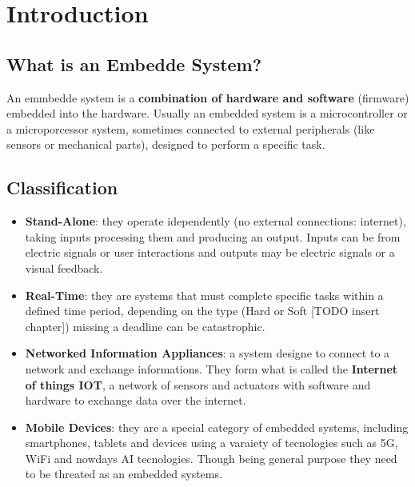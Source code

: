 \section{Introduction}
\subsection{What is an Embedde System?}
  An emmbedde system is a \textbf{combination of hardware and software} (firmware) embedded into the hardware. 
  Usually an embedded system is a microcontroller or a microporcessor system, sometimes connected to external peripherals (like sensors or mechanical parts), designed to perform a specific task. 

\subsection{Classification}
  \begin{itemize}
    \item {\textbf{Stand-Alone}: they operate idependently (no external connections: internet), taking inputs processing them and producing an output. Inputs can be from electric signals or user interactions and outputs may be electric signals or a visual feedback.}
    \item {\textbf{Real-Time}: they are systems that must complete specific tasks within a defined time period, depending on the type (Hard or Soft [TODO insert chapter]) missing a deadline can be catastrophic.}
    \item {\textbf{Networked Information Appliances}: a system designe to connect to a network and exchange informations. They form what is called the \textbf{Internet of things \textemdash IOT}, a network of sensors and actuators with software and hardware to exchange data over the internet.}
    \item {\textbf{Mobile Devices}: they are a special category of embedded systems, including smartphones, tablets and devices using a varaiety of tecnologies such as 5G, Wi\textemdash Fi and nowdays AI tecnologies. Though being general purpose they need to be threated as an embedded systems.}
  \end{itemize}

  

